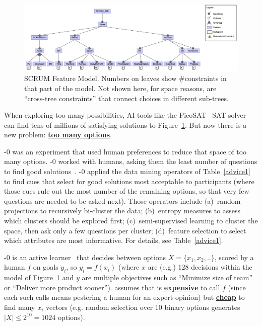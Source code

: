 \documentclass[twoside]{NSF}
\newcommand{\IT}{{\sffamily {\em \mbox{ADVICE}}}}
\newcommand{\ITS}[1]{\mbox{{\IT}-#1}}
\begin{document}
\begin{nsfdescription}
 
   
\begin{figure}[!t]
\hspace{8mm} \includegraphics[width=.83\textwidth]{fig/scrumModel.png}
  \caption{{\small   SCRUM Feature Model.
 Numbers on   leaves show \#constraints in that part of
  the model. Not shown here, for space reasons, are   ``cross-tree constraints''
 that connect choices in different sub-trees. }}
  \label{fig:scrumModel}
\end{figure} 


When exploring
 too many possibilities,
AI tools like 
the PicoSAT~\cite{biere2008picosat} SAT solver can find tens of millions of satisfying solutions to Figure~\ref{fig:scrumModel}.
But now there is a new problem: \underline{\bf too many options}.

 
  
 
 \ITS{0} was an experiment that used human preferences to reduce
that space of too many options.
{\ITS{0}}  worked with humans, asking them the least number of questions to find good solutions~\cite{lustosa21}.
 {\ITS{0}} applied
the data mining operators 
of Table~\ref{advice1} to find cues that    select for good solutions most acceptable to participants (where those cues rule out the most number of the remaining options, so that very few questions are needed to be asked next).
Those operators include
(a)~random projections to recursively
  bi-cluster the data; (b)~entropy measures to assess
  which clusters should be explored first;
  (c)~semi-supervised learning to cluster the space, then ask only a few questions
  per cluster;
  (d)~feature selection to select which attributes are most informative. 
  For details, see Table~\ref{advice1}.
  
  {\ITS{0}} is an active learner~\cite{settles2009active} that decides between options $X=\{x_1,x_2,..\}$,   scored
by a human $f$ on goals $y_i$, so   $y_i=f(x_i)$
(where $x$ are (e.g.) 128 decisions within the model of Figure~\ref{fig:scrumModel}
and   $y$ are 
multiple objectives
such as
``Minimize size of team''  or
``Deliver more product sooner'').
 {\IT} assumes that is 
 \underline{\bf   expensive} to call $f$ (since each such calls means
pestering a human for an expert opinion) but
  \underline{\bf   cheap} to find   many $x_i$ vectors (e.g.  random   selection over  10 binary options
  generates  $|X| \le 2^{10}=1024$ options). 
   

\end{nsfdescription}
\end{document}
